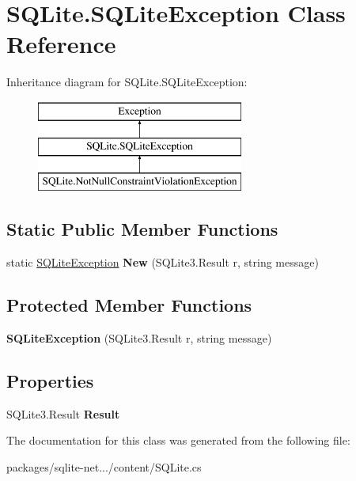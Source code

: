 \hypertarget{classSQLite_1_1SQLiteException}{}\section{S\+Q\+Lite.\+S\+Q\+Lite\+Exception Class Reference}
\label{classSQLite_1_1SQLiteException}
Inheritance diagram for S\+Q\+Lite.\+S\+Q\+Lite\+Exception\+:\begin{figure}[H]
\begin{center}
\leavevmode
\includegraphics[height=3.000000cm]{classSQLite_1_1SQLiteException}
\end{center}
\end{figure}
\subsection*{Static Public Member Functions}
\begin{DoxyCompactItemize}
\item 
\hypertarget{classSQLite_1_1SQLiteException_ac74e9093fc476760b090efb43d226a97}{}static \hyperlink{classSQLite_1_1SQLiteException}{S\+Q\+Lite\+Exception} {\bfseries New} (S\+Q\+Lite3.\+Result r, string message)\label{classSQLite_1_1SQLiteException_ac74e9093fc476760b090efb43d226a97}

\end{DoxyCompactItemize}
\subsection*{Protected Member Functions}
\begin{DoxyCompactItemize}
\item 
\hypertarget{classSQLite_1_1SQLiteException_a360138124608a44ec47ab94e6bb988f8}{}{\bfseries S\+Q\+Lite\+Exception} (S\+Q\+Lite3.\+Result r, string message)\label{classSQLite_1_1SQLiteException_a360138124608a44ec47ab94e6bb988f8}

\end{DoxyCompactItemize}
\subsection*{Properties}
\begin{DoxyCompactItemize}
\item 
\hypertarget{classSQLite_1_1SQLiteException_a973d7bbe93363a91182d852fed38f5f3}{}S\+Q\+Lite3.\+Result {\bfseries Result}\label{classSQLite_1_1SQLiteException_a973d7bbe93363a91182d852fed38f5f3}

\end{DoxyCompactItemize}


The documentation for this class was generated from the following file\+:\begin{DoxyCompactItemize}
\item 
packages/sqlite-\/net.../content/S\+Q\+Lite.\+cs\end{DoxyCompactItemize}

